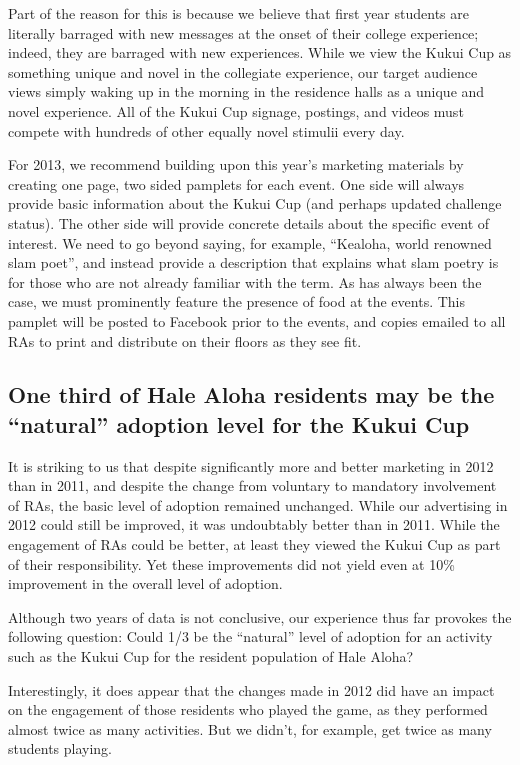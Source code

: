 \documentclass[]{article}
\begin{document}
Part of the reason for this is because we believe that first year students are literally
barraged with new messages at the onset of their college experience; indeed, they are
barraged with new experiences.  While we view the Kukui Cup as something unique and novel
in the collegiate experience, our target audience views simply waking up in the
morning in the residence halls as a unique and novel experience.  All of the Kukui Cup
signage, postings, and videos must compete with hundreds of other equally novel stimulii every
day.  

For 2013, we recommend building upon this year's marketing materials by creating one page,
two sided pamplets for each event.  One side will always provide basic information about
the Kukui Cup (and perhaps updated challenge status).  The other side will provide
concrete details about the specific event of interest.  We need to go beyond saying, for
example, ``Kealoha, world renowned slam poet'', and instead provide a description that
explains what slam poetry is for those who are not already familiar with the term.  As has
always been the case, we must prominently feature the presence of food at the events.
This pamplet will be posted to Facebook prior to the events, and copies emailed to all RAs
to print and distribute on their floors as they see fit.


\subsection{One third of Hale Aloha residents may be the ``natural'' adoption level for
  the Kukui Cup}  

It is striking to us that despite significantly more and better marketing in 2012 than in
2011, and despite the change from voluntary to mandatory involvement of RAs, the basic
level of adoption remained unchanged.  While our advertising in 2012 could still be improved, it
was undoubtably better than in 2011.  While the engagement of RAs could be better, at
least they viewed the Kukui Cup as part of their responsibility.  Yet these improvements
did not yield even at 10\% improvement in the overall level of adoption.  

Although two years of data is not conclusive, our experience thus far provokes the 
following question:  Could 1/3 be the ``natural'' level of adoption for an activity such
as the Kukui Cup for the resident population of Hale Aloha?

Interestingly, it does appear that the changes made in 2012 did have an impact on the
engagement of those residents who played the game, as they performed almost twice as many
activities.  But we didn't, for example, get twice as many students playing.
\end{document}
